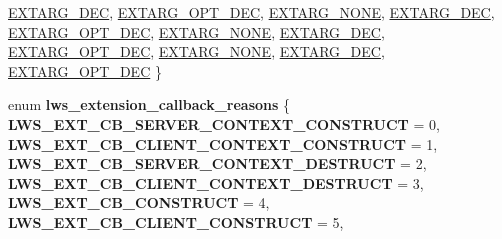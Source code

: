 \begin{DoxyCompactItemize}
\hyperlink{group__extensions_ggacc9f55936dc165257a2e1f7d47bce89ea1c86adf924c8786a12bee9687094673e}{E\+X\+T\+A\+R\+G\+\_\+\+D\+EC}, 
\hyperlink{group__extensions_ggacc9f55936dc165257a2e1f7d47bce89ea5265abe3e1c3f64412f2affe7bffd880}{E\+X\+T\+A\+R\+G\+\_\+\+O\+P\+T\+\_\+\+D\+EC}, 
\hyperlink{group__extensions_ggacc9f55936dc165257a2e1f7d47bce89eaabcf56c456c1ff6e81dc82586a16f14c}{E\+X\+T\+A\+R\+G\+\_\+\+N\+O\+NE}, 
\hyperlink{group__extensions_ggacc9f55936dc165257a2e1f7d47bce89ea1c86adf924c8786a12bee9687094673e}{E\+X\+T\+A\+R\+G\+\_\+\+D\+EC}, 
\newline
\hyperlink{group__extensions_ggacc9f55936dc165257a2e1f7d47bce89ea5265abe3e1c3f64412f2affe7bffd880}{E\+X\+T\+A\+R\+G\+\_\+\+O\+P\+T\+\_\+\+D\+EC}, 
\hyperlink{group__extensions_ggacc9f55936dc165257a2e1f7d47bce89eaabcf56c456c1ff6e81dc82586a16f14c}{E\+X\+T\+A\+R\+G\+\_\+\+N\+O\+NE}, 
\hyperlink{group__extensions_ggacc9f55936dc165257a2e1f7d47bce89ea1c86adf924c8786a12bee9687094673e}{E\+X\+T\+A\+R\+G\+\_\+\+D\+EC}, 
\hyperlink{group__extensions_ggacc9f55936dc165257a2e1f7d47bce89ea5265abe3e1c3f64412f2affe7bffd880}{E\+X\+T\+A\+R\+G\+\_\+\+O\+P\+T\+\_\+\+D\+EC}, 
\newline
\hyperlink{group__extensions_ggacc9f55936dc165257a2e1f7d47bce89eaabcf56c456c1ff6e81dc82586a16f14c}{E\+X\+T\+A\+R\+G\+\_\+\+N\+O\+NE}, 
\hyperlink{group__extensions_ggacc9f55936dc165257a2e1f7d47bce89ea1c86adf924c8786a12bee9687094673e}{E\+X\+T\+A\+R\+G\+\_\+\+D\+EC}, 
\hyperlink{group__extensions_ggacc9f55936dc165257a2e1f7d47bce89ea5265abe3e1c3f64412f2affe7bffd880}{E\+X\+T\+A\+R\+G\+\_\+\+O\+P\+T\+\_\+\+D\+EC}
 \}
\item 
\mbox{\label{group__extensions_gae9993815eee72c6070300a0ae2f022d7}} 
enum {\bfseries lws\+\_\+extension\+\_\+callback\+\_\+reasons} \{ \newline
{\bfseries L\+W\+S\+\_\+\+E\+X\+T\+\_\+\+C\+B\+\_\+\+S\+E\+R\+V\+E\+R\+\_\+\+C\+O\+N\+T\+E\+X\+T\+\_\+\+C\+O\+N\+S\+T\+R\+U\+CT} = 0, 
{\bfseries L\+W\+S\+\_\+\+E\+X\+T\+\_\+\+C\+B\+\_\+\+C\+L\+I\+E\+N\+T\+\_\+\+C\+O\+N\+T\+E\+X\+T\+\_\+\+C\+O\+N\+S\+T\+R\+U\+CT} = 1, 
{\bfseries L\+W\+S\+\_\+\+E\+X\+T\+\_\+\+C\+B\+\_\+\+S\+E\+R\+V\+E\+R\+\_\+\+C\+O\+N\+T\+E\+X\+T\+\_\+\+D\+E\+S\+T\+R\+U\+CT} = 2, 
{\bfseries L\+W\+S\+\_\+\+E\+X\+T\+\_\+\+C\+B\+\_\+\+C\+L\+I\+E\+N\+T\+\_\+\+C\+O\+N\+T\+E\+X\+T\+\_\+\+D\+E\+S\+T\+R\+U\+CT} = 3, 
\newline
{\bfseries L\+W\+S\+\_\+\+E\+X\+T\+\_\+\+C\+B\+\_\+\+C\+O\+N\+S\+T\+R\+U\+CT} = 4, 
{\bfseries L\+W\+S\+\_\+\+E\+X\+T\+\_\+\+C\+B\+\_\+\+C\+L\+I\+E\+N\+T\+\_\+\+C\+O\+N\+S\+T\+R\+U\+CT} = 5, 

\end{DoxyCompactItemize}
